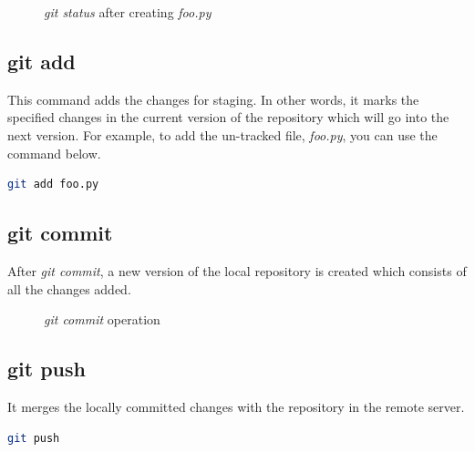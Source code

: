 \documentclass[letterpaper]{article}
\begin{document}
\begin{figure}[h]
    \centering
    \caption{\textit{git status} after creating \textit{foo.py}}
  \end{figure}


\subsection{git add}
This command adds the changes for staging. In other words, it marks the specified changes in the current version of the repository which will go into the next version. For example, to add the un-tracked file, \textit{foo.py}, you can use the command below.
\begin{lstlisting}[language=Bash]
git add foo.py
\end{lstlisting}

\subsection{git commit}
 After \textit{git commit}, a new version of the local repository is created which consists of all the changes added.

\begin{figure}[h]
    \centering
    \caption{\textit{git commit} operation}
  \end{figure}


\subsection{git push}
It merges the locally committed changes with the repository in the remote server.

\begin{lstlisting}[language=Bash]
git push
\end{lstlisting}
\end{document}
